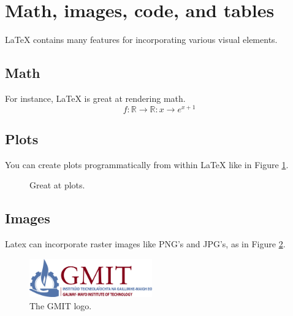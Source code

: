   \section{Math, images, code, and tables}
    \LaTeX{} contains many features for incorporating various visual elements.
    
    \subsection{Math}
      For instance, \LaTeX{} is great at rendering math.
      $$ f:\mathbb{R} \rightarrow \mathbb{R}:x \rightarrow e^{x+1} $$


    \subsection{Plots}
      You can create plots programmatically from within \LaTeX{} like in Figure 
      \ref{plot:xsqfour}.
      \begin{figure}[H]
        \begin{center}
        \end{center}
        \caption{Great at plots.}
        \label{plot:xsqfour}
      \end{figure}

    \subsection{Images}
      Latex can incorporate raster images like PNG's and JPG's, as in Figure
      \ref{img:logo}.
      \begin{figure}[H]
        \begin{center}
          \includegraphics[width=200px]{img/gmit-logo.jpg}
        \end{center}
        \caption{The GMIT logo.}
        \label{img:logo}
      \end{figure}
    
